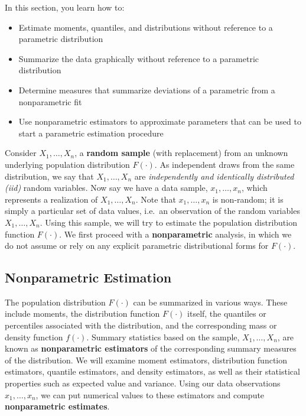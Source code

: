 \documentclass[]{book}
\providecommand{\tightlist}{%
  \setlength{\itemsep}{0pt}\setlength{\parskip}{0pt}}
\theoremstyle{definition}
\theoremstyle{definition}
\theoremstyle{definition}
\theoremstyle{remark}
\begin{document}
In this section, you learn how to:

\begin{itemize}
\tightlist
\item
  Estimate moments, quantiles, and distributions without reference to a
  parametric distribution
\item
  Summarize the data graphically without reference to a parametric
  distribution
\item
  Determine measures that summarize deviations of a parametric from a
  nonparametric fit
\item
  Use nonparametric estimators to approximate parameters that can be
  used to start a parametric estimation procedure
\end{itemize}

Consider \(X_1, \ldots, X_n\), a \textbf{random sample} (with
replacement) from an unknown underlying population distribution
\(F(\cdot)\). As independent draws from the same distribution, we say
that \(X_1, \ldots, X_n\) are \emph{independently and identically
distributed (iid)} random variables. Now say we have a data sample,
\(x_1, \dots, x_n\), which represents a realization of
\(X_1, \ldots, X_n\). Note that \(x_1, \ldots, x_n\) is non-random; it
is simply a particular set of data values, i.e.~an observation of the
random variables \(X_1, \ldots, X_n\). Using this sample, we will try to
estimate the population distribution function \(F(\cdot)\). We first
proceed with a \textbf{nonparametric} analysis, in which we do not
assume or rely on any explicit parametric distributional forms for
\(F(\cdot)\).

\subsection{Nonparametric Estimation}\label{nonparametric-estimation}

The population distribution \(F(\cdot)\) can be summarized in various
ways. These include moments, the distribution function \(F(\cdot)\)
itself, the quantiles or percentiles associated with the distribution,
and the corresponding mass or density function \(f(\cdot)\). Summary
statistics based on the sample, \(X_1, \ldots, X_n\), are known as
\textbf{nonparametric estimators} of the corresponding summary measures
of the distribution. We will examine moment estimators, distribution
function estimators, quantile estimators, and density estimators, as
well as their statistical properties such as expected value and
variance. Using our data observations \(x_1, \ldots, x_n\), we can put
numerical values to these estimators and compute \textbf{nonparametric
estimates}.
\end{document}
